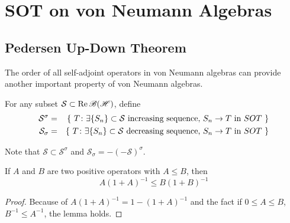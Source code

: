 \section{SOT on von Neumann Algebras}

\subsection{Pedersen Up-Down Theorem}

The order of all self-adjoint operators in von Neumann algebras can provide another important property of von Neumann algebras.

\begin{defn}
	For any subset $\mathcal{S} \subset \operatorname{Re}{\mathscr{B(H)}}$, define
	\begin{eqnarray*}
		\mathcal{S}^{\sigma} &=& \{~T \colon \exists \{S_n\} \subset \mathcal{S}  \text{  increasing sequence, } S_n \rightarrow T \text{ in } SOT~\} \\
		\mathcal{S}_{\sigma} &=& \{~T \colon \exists \{S_n\} \subset \mathcal{S}  \text{  decreasing sequence, } S_n \rightarrow T \text{ in } SOT~\}
	\end{eqnarray*}
\end{defn}
\begin{rem}
	Note that $\mathcal{S}  \subset \mathcal{S}^{\sigma}$ and $\mathcal{S}_{\sigma} = -(-\mathcal{S})^{\sigma}$.
\end{rem}

\begin{lem}
	If $A$ and $B$ are two positive operators with $A  \leqslant B$, then
	\begin{equation*}
		A(1+A)^{-1} \leqslant B(1+B)^{-1}
	\end{equation*}
\end{lem}
\begin{proof}
	Because of $A(1+A)^{-1} = 1  - (1+A)^{-1}$ and the fact if $0 \leqslant A \leqslant B$, $B^{-1} \leqslant A^{-1}$, the lemma holds.
\end{proof}

